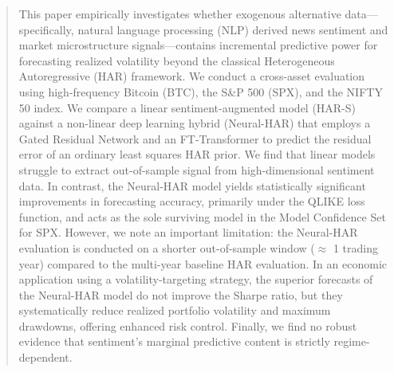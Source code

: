 \begin{abstract}
This paper empirically investigates whether exogenous alternative data---specifically, natural language processing (NLP) derived news sentiment and market microstructure signals---contains incremental predictive power for forecasting realized volatility beyond the classical Heterogeneous Autoregressive (HAR) framework. We conduct a cross-asset evaluation using high-frequency Bitcoin (BTC), the S\&P 500 (SPX), and the NIFTY 50 index. We compare a linear sentiment-augmented model (HAR-S) against a non-linear deep learning hybrid (Neural-HAR) that employs a Gated Residual Network and an FT-Transformer to predict the residual error of an ordinary least squares HAR prior. We find that linear models struggle to extract out-of-sample signal from high-dimensional sentiment data. In contrast, the Neural-HAR model yields statistically significant improvements in forecasting accuracy, primarily under the QLIKE loss function, and acts as the sole surviving model in the Model Confidence Set for SPX. However, we note an important limitation: the Neural-HAR evaluation is conducted on a shorter out-of-sample window ($\approx$ 1 trading year) compared to the multi-year baseline HAR evaluation. In an economic application using a volatility-targeting strategy, the superior forecasts of the Neural-HAR model do not improve the Sharpe ratio, but they systematically reduce realized portfolio volatility and maximum drawdowns, offering enhanced risk control. Finally, we find no robust evidence that sentiment's marginal predictive content is strictly regime-dependent.
\end{abstract}
